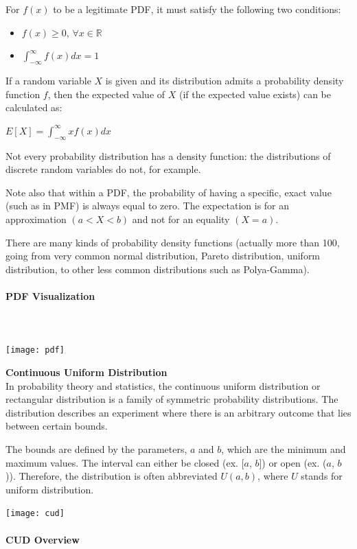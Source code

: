 \documentclass{article}
\begin{document}
For $f(x)$ to be a legitimate PDF, it must satisfy the following two conditions:
\begin{itemize}
    \item $f(x) \geq 0$, $\forall x \in \mathbb{R}$
    \item $\displaystyle \int _{-\infty }^{\infty } f(x)dx=1$
\end{itemize}
If a random variable $X$ is given and its distribution admits a probability density function $f$, then the expected value of $X$ (if the expected value exists) can be calculated as:

$\displaystyle {E} [X]=\int _{-\infty }^{\infty }xf(x)dx$

Not every probability distribution has a density function: the distributions of discrete random variables do not, for example.

Note also that within a PDF, the probability of having a specific, exact value (such as in PMF) is always equal to zero. The expectation is for an approximation $(a < X < b)$ and not for an equality $(X = a)$.

There are many kinds of probability density functions (actually more than 100, going from very common normal distribution, Pareto distribution, uniform distribution, to other less common distributions such as Polya-Gamma). 

\paragraph{PDF Visualization}\mbox{} \\
\mbox{} \\

\texttt{[image: pdf]}

\textbf{Continuous Uniform Distribution} \\
In probability theory and statistics, the continuous uniform distribution or rectangular distribution is a family of symmetric probability distributions. The distribution describes an experiment where there is an arbitrary outcome that lies between certain bounds. 

The bounds are defined by the parameters, $a$ and $b$, which are the minimum and maximum values. The interval can either be closed (ex. [$a$, $b$]) or open (ex. ($a$, $b$)).
Therefore, the distribution is often abbreviated $U (a, b)$, where $U$ stands for uniform distribution.

\texttt{[image: cud]}

\paragraph{CUD Overview}\mbox{} \\
\end{document}
